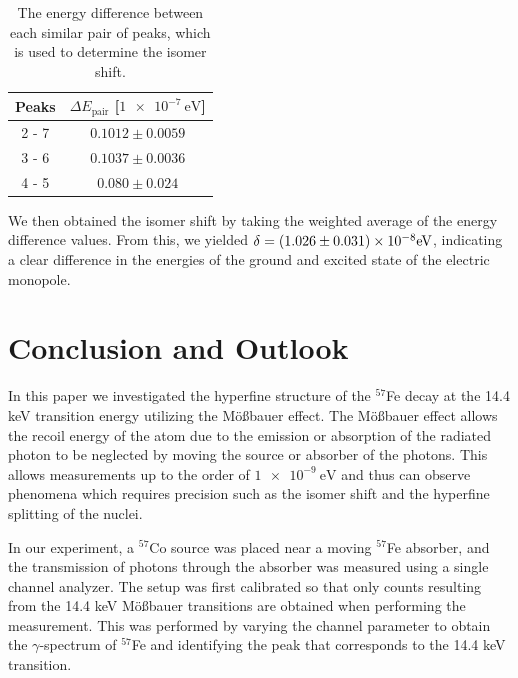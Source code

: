 \documentclass[a4paper]{report}
\numberwithin{equation}{section}
\begin{document}
\begin{table}[!ht]
    \centering
    \begin{tabular}{|c|c|}
    \hline
        Peaks & $\Delta E_\mathrm{pair}$ [$\SI{1e-7}{\electronvolt}$] \\ \hline
        2 - 7 & $0.1012 \pm 0.0059$ \\ \hline
        3 - 6 & $0.1037 \pm 0.0036$ \\ \hline
        4 - 5 & $0.080 \pm 0.024$ \\ \hline
    \end{tabular}
    \caption{The energy difference between each similar pair of peaks, which is used to determine the isomer shift.}
    \label{tab:isomer_en}
\end{table}

We then obtained the isomer shift by taking the weighted average of the energy difference values. From this, we yielded
$\delta = \num[scientific-notation=true]{0.1026(31)e-7}\si[]{\electronvolt}$, indicating a clear difference in the 
energies of the ground and excited state of the electric monopole. \par 

\chapter{Conclusion and Outlook}

In this paper we investigated the hyperfine structure of the $^{57}$Fe decay
 at the 14.4 keV transition energy utilizing the M\"o{\ss}bauer effect. The M\"o{\ss}bauer effect
 allows the recoil energy of the atom due to the emission or absorption of the radiated
 photon to be neglected by moving the source or absorber of the photons. This allows measurements 
 up to the order of $\SI{1e-9}{\electronvolt}$ and thus can observe phenomena which requires 
 precision such as the isomer shift and the hyperfine splitting of the nuclei. \par
 
 In our experiment, a $^{57}$Co source was placed near a moving $^{57}$Fe absorber, and the transmission 
 of photons through the absorber was measured using a single channel analyzer. The setup was 
 first calibrated so that only counts resulting from the 14.4 keV M\"o{\ss}bauer transitions are obtained when 
 performing the measurement. This was performed by varying the channel parameter to obtain the 
 $\gamma$-spectrum of $^{57}$Fe and identifying the peak that corresponds to the 14.4 keV transition. \par 
\end{document}
